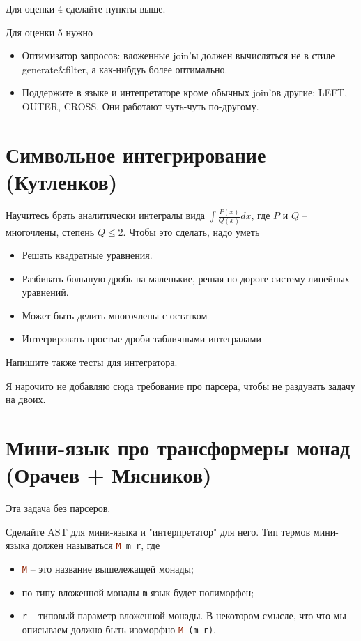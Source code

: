 \documentclass[a4paper,14pt]{article}
\def\hsinline{\lstinline[language=haskell]}
\begin{document}
Для оценки 4 сделайте пункты выше. 

Для оценки 5 нужно 
\begin{itemize}
 \item Оптимизатор запросов: вложенные join'ы должен вычисляться не в стиле generate\&filter, а как-нибдуь более оптимально.
 \item Поддержите в языке и интепретаторе кроме обычных join'ов другие: LEFT, OUTER, CROSS. Они работают чуть-чуть по-другому.
\end{itemize}

\section{Символьное интегрирование (Кутленков)}
Научитесь брать аналитически интегралы вида $\int{\frac{P(x)}{Q(x)}dx} $, где $P$ и $Q$ -- многочлены, степень $Q \leq 2$. Чтобы это сделать, надо уметь  
\begin{itemize}
 \item Решать квадратные уравнения.
 \item Разбивать большую дробь на маленькие, решая по дороге систему линейных уравнений.
 \item Может быть делить многочлены с остатком
 \item Интегрировать простые дроби табличными интегралами
\end{itemize}

Напишите также 
тесты для интегратора.

Я нарочито не добавляю сюда требование про парсера, чтобы не раздувать задачу на двоих.

\section{Мини-язык про трансформеры монад (Орачев + Мясников)}

Эта задача без парсеров.

Сделайте AST для мини-языка и "интерпретатор" для него. Тип термов мини-языка должен называться \hsinline=M m r=, где  
\begin{itemize}
 \item \hsinline=M= -- это название вышележащей монады; 
 \item по типу вложенной монады \hsinline=m=  язык будет полиморфен;
 \item \hsinline=r= -- типовый параметр вложенной монады. В некотором смысле, что что мы описываем должно быть изоморфно \hsinline{M (m r)}.
\end{itemize}
 
\end{document}
